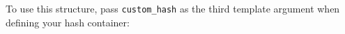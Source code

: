 


To use this structure, pass \lstinline|custom_hash| as the third template argument when defining your hash container:

